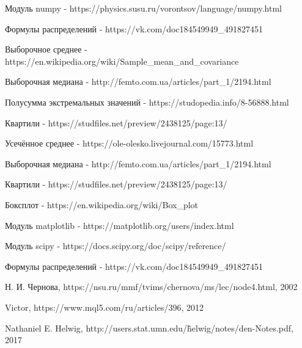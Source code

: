 \documentclass[a4]{article}
\begin{document}
\begin{thebibliography}{}

       Модуль numpy  -  https://physics.susu.ru/vorontsov/language/numpy.html
    
    Формулы распределений  -  https://vk.com/doc184549949\_491827451
    
    Выборочное среднее  -  https://en.wikipedia.org/wiki/Sample\_mean\_and\_covariance
    
    Выборочная медиана  -  http://femto.com.ua/articles/part\_1/2194.html
    
    Полусумма экстремальных значений  -  https://studopedia.info/8-56888.html
    
    Квартили  -  https://studfiles.net/preview/2438125/page:13/
    
      Усечённое среднее  -  https://ole-olesko.livejournal.com/15773.html
    
    
    
    Выборочная медиана  -  http://femto.com.ua/articles/part\_1/2194.html
    
    Квартили -  https://studfiles.net/preview/2438125/page:13/
    
    Боксплот - https://en.wikipedia.org/wiki/Box\_plot
    
    
    
    
    
    Модуль matplotlib - https://matplotlib.org/users/index.html
    
    Модуль scipy - https://docs.scipy.org/doc/scipy/reference/
    
    Формулы распределений  -  https://vk.com/doc184549949\_491827451
    
    Н. И. Чернова, https://nsu.ru/mmf/tvims/chernova/ms/lec/node4.html, 2002
    
    Victor, https://www.mql5.com/ru/articles/396, 2012
    
    Nathaniel E. Helwig, http://users.stat.umn.edu/\~helwig/notes/den-Notes.pdf, 2017

    
    
\end{thebibliography}
\end{document}
